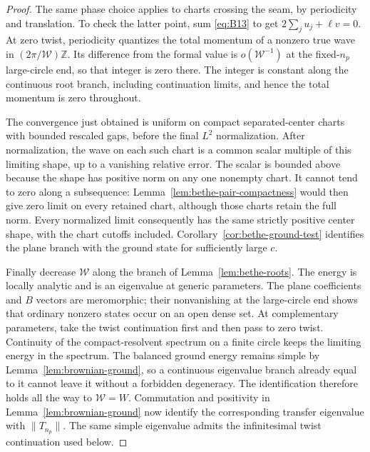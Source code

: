 \begin{proof}
The same phase choice applies to charts crossing the seam, by periodicity
and translation.  To check the latter point, sum \eqref{eq:B13} to get
$2\sum_j u_j+\ell v=0$.  At zero twist, periodicity quantizes the total
momentum of a nonzero true wave in $(2\pi/\mathcal W)\mathbb Z$.
Its difference from the formal value is $o(\mathcal W^{-1})$ at the
fixed-$n_p$ large-circle end, so that integer is zero there.  The integer
is constant along the continuous root branch, including continuation
limits, and hence the total momentum is zero throughout.

The convergence just obtained is uniform on compact separated-center
charts with bounded rescaled gaps, before the final $L^2$ normalization.
After normalization, the wave on each such chart is a common scalar
multiple of this limiting shape, up to a vanishing relative error.
The scalar is bounded above because the shape has positive norm on
any one nonempty chart.  It cannot tend to zero along a subsequence:
Lemma~\ref{lem:bethe-pair-compactness} would then give zero limit on
every retained chart, although those charts retain the full norm.
Every normalized limit consequently has the same strictly positive
center shape, with the chart cutoffs included.
Corollary~\ref{cor:bethe-ground-test} identifies the plane branch with
the ground state for sufficiently large $c$.

Finally decrease $\mathcal W$ along the branch of
Lemma~\ref{lem:bethe-roots}.  The energy is locally analytic and is an
eigenvalue at generic parameters.  The plane coefficients and $B$
vectors are meromorphic; their nonvanishing at the large-circle end
shows that ordinary nonzero states occur on an open dense set.  At
complementary parameters, take the twist continuation first and then
pass to zero twist.  Continuity of the compact-resolvent spectrum on
a finite circle keeps the limiting energy in the spectrum.  The
balanced ground energy remains simple by
Lemma~\ref{lem:brownian-ground}, so a continuous eigenvalue branch
already equal to it cannot leave it without a forbidden degeneracy.
The identification therefore holds all the way to $\mathcal W=W$.
Commutation and positivity in Lemma~\ref{lem:brownian-ground} now
identify the corresponding transfer eigenvalue with $\|T_{n_p}\|$.
The same simple eigenvalue admits the infinitesimal twist continuation
used below.
\end{proof}


